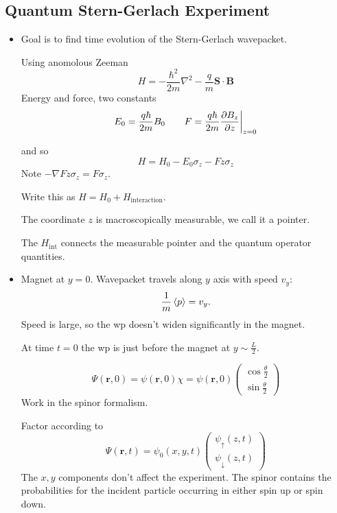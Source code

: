 \documentclass[11pt, a4paper]{article}
\renewcommand{\grad}{\nabla}
\renewcommand{\laplacian}{\nabla^{2}}
\renewcommand{\vec}[1]{\bm{#1}}  %
\newcommand{\ua}{\uparrow}  %
\newcommand{\da}{\downarrow}  %
\renewcommand{\r}{\vec{r}}  %
\renewcommand{\S}{\vec{S}}  %
\newcommand{\B}{\vec{B}}  %
\begin{document}
\subsection{Quantum Stern-Gerlach Experiment}
\begin{itemize}
    \item Goal is to find time evolution of the Stern-Gerlach wavepacket. 

    Using anomolous Zeeman
    \begin{equation*}
        H = - \frac{\hbar^{2}}{2m}\laplacian - \frac{q}{m}\S \cdot \B
    \end{equation*}
    Energy and force, two constants
    \begin{equation*}
        E_{0} = \frac{q \hbar}{2m} B_{0} \qquad F = \frac{q \hbar}{2m} \pdv{B_{z}}{z} \bigg |_{z = 0}
    \end{equation*}

    and so
    \begin{equation*}
        H = H_{0} - E_{0} \sigma_{z} - F z \sigma_{z}
    \end{equation*}
    Note $ -\grad F z \sigma_{z} = F\sigma_{z} $.

    Write this as $ H = H_{0} + H_{\text{interaction}} $.
    
    The coordinate $ z $ is macroscopically measurable, we call it a pointer. 

    The $ H_{\text{int}} $ connects the measurable pointer and the quantum operator quantities.

    \item Magnet at $ y = 0 $. Wavepacket travels along $ y $ axis with speed $ v_{y} $:
    \begin{equation*}
        \frac{1}{m} \ev{p} = v_{y}. 
    \end{equation*}
    Speed is large, so the wp doesn't widen significantly in the magnet. 


    At time $ t = 0 $ the wp is just before the magnet at $ y \sim \frac{L}{2} $. 

    \begin{equation*}
        \Psi(\r, 0) = \psi(\r, 0)\chi = \psi(\r, 0) 
        \begin{pmatrix}
            \cos \frac{\theta}{2}\\
            \sin \frac{\theta}{2}
        \end{pmatrix}
    \end{equation*}
    Work in the spinor formalism. 

    Factor according to 
    \begin{equation*}
        \Psi(\r, t) = \psi_{0}(x, y, t) 
        \begin{pmatrix}
            \psi_{\ua}(z, t)\\
            \psi_{\da}(z, t)
        \end{pmatrix}
    \end{equation*}
    The $ x, y $ components don't affect the experiment. The spinor contains the probabilities for the incident particle occurring in either spin up or spin down.
    

\end{itemize}
\end{document}
